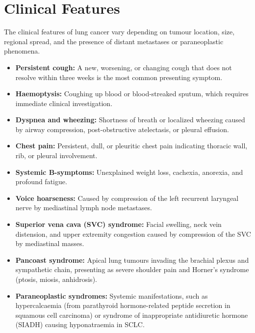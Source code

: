 \section*{Clinical Features}
The clinical features of lung cancer vary depending on tumour location, size, regional spread, and the presence of distant metastases or paraneoplastic phenomena.
\begin{itemize}
    \item \textbf{Persistent cough:} A new, worsening, or changing cough that does not resolve within three weeks is the most common presenting symptom.
    \item \textbf{Haemoptysis:} Coughing up blood or blood-streaked sputum, which requires immediate clinical investigation.
    \item \textbf{Dyspnea and wheezing:} Shortness of breath or localized wheezing caused by airway compression, post-obstructive atelectasis, or pleural effusion.
    \item \textbf{Chest pain:} Persistent, dull, or pleuritic chest pain indicating thoracic wall, rib, or pleural involvement.
    \item \textbf{Systemic B-symptoms:} Unexplained weight loss, cachexia, anorexia, and profound fatigue.
    \item \textbf{Voice hoarseness:} Caused by compression of the left recurrent laryngeal nerve by mediastinal lymph node metastases.
    \item \textbf{Superior vena cava (SVC) syndrome:} Facial swelling, neck vein distension, and upper extremity congestion caused by compression of the SVC by mediastinal masses.
    \item \textbf{Pancoast syndrome:} Apical lung tumours invading the brachial plexus and sympathetic chain, presenting as severe shoulder pain and Horner's syndrome (ptosis, miosis, anhidrosis).
    \item \textbf{Paraneoplastic syndromes:} Systemic manifestations, such as hypercalcaemia (from parathyroid hormone-related peptide secretion in squamous cell carcinoma) or syndrome of inappropriate antidiuretic hormone (SIADH) causing hyponatraemia in SCLC.
\end{itemize}


